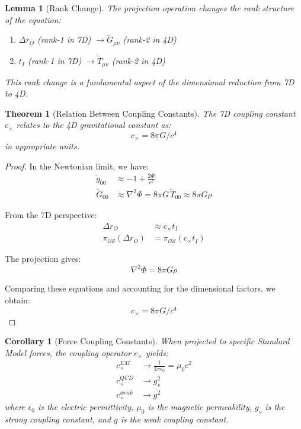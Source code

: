 \documentclass{article}
\newcommand{\tl}[1]{\tilde{#1}}
\newtheorem{theorem}{Theorem}
\newtheorem{lemma}{Lemma}
\newtheorem{corollary}{Corollary}
\begin{document}
\begin{lemma}[Rank Change]
The projection operation changes the rank structure of the equation:
\begin{enumerate}
\item $\Delta r_O$ (rank-1 in 7D) $\to \tl{G}_{\mu\nu}$ (rank-2 in 4D)
\item $t_I$ (rank-1 in 7D) $\to \tl{T}_{\mu\nu}$ (rank-2 in 4D)
\end{enumerate}
This rank change is a fundamental aspect of the dimensional reduction from 7D to 4D.
\end{lemma}

\begin{theorem}[Relation Between Coupling Constants]
The 7D coupling constant $c_{\times}$ relates to the 4D gravitational constant as:
\begin{equation}
c_{\times} = 8\pi G/c^4
\end{equation}
in appropriate units.
\end{theorem}

\begin{proof}
In the Newtonian limit, we have:
\begin{align}
\tl{g}_{00} &\approx -1 + \frac{2\Phi}{c^2} \\
\tl{G}_{00} &\approx \nabla^2\Phi = 8\pi G \, \tl{T}_{00} \approx 8\pi G \rho
\end{align}

From the 7D perspective:
\begin{align}
\Delta r_O &\approx c_{\times} t_I \\
\pi_{\mathcal{OS}}(\Delta r_O) &= \pi_{\mathcal{OS}}(c_{\times} t_I)
\end{align}

The projection gives:
\begin{equation}
\nabla^2\Phi = 8\pi G \rho
\end{equation}

Comparing these equations and accounting for the dimensional factors, we obtain:
\begin{equation}
c_{\times} = 8\pi G/c^4
\end{equation}
\end{proof}

\begin{corollary}[Force Coupling Constants]
When projected to specific Standard Model forces, the coupling operator $c_{\times}$ yields:
\begin{align}
c_{\times}^{EM} &\to \frac{1}{4\pi\epsilon_0} = \mu_0 c^2 \\
c_{\times}^{QCD} &\to g_s^2 \\
c_{\times}^{weak} &\to g^2
\end{align}
where $\epsilon_0$ is the electric permittivity, $\mu_0$ is the magnetic permeability, $g_s$ is the strong coupling constant, and $g$ is the weak coupling constant.
\end{corollary}
\end{document}
